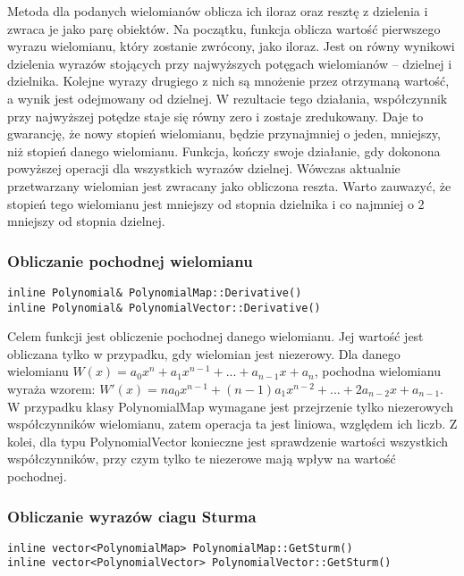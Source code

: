 \documentclass[twoside,a4paper]{book}
\begin{document}
Metoda dla podanych wielomianów oblicza ich iloraz oraz resztę z dzielenia i zwraca je jako parę obiektów. Na początku, funkcja oblicza wartość pierwszego wyrazu wielomianu, który zostanie zwrócony, jako iloraz. Jest on równy wynikowi dzielenia wyrazów stojących przy najwyższych potęgach wielomianów – dzielnej i dzielnika. Kolejne wyrazy drugiego z nich są mnożenie przez otrzymaną wartość, a wynik jest odejmowany od dzielnej. W rezultacie tego działania, współczynnik przy najwyższej potędze staje się równy zero i zostaje zredukowany. Daje to gwarancję, że nowy stopień wielomianu, będzie przynajmniej o jeden, mniejszy, niż stopień danego wielomianu. Funkcja, kończy swoje działanie, gdy dokonona powyższej operacji dla wszystkich wyrazów dzielnej. Wówczas aktualnie przetwarzany wielomian jest zwracany jako obliczona reszta. Warto zauwazyć, że stopień tego wielomianu jest mniejszy od stopnia dzielnika i co najmniej o 2 mniejszy od stopnia dzielnej.
\\

\subsubsection{Obliczanie pochodnej wielomianu}
\begin{lstlisting}
inline Polynomial& PolynomialMap::Derivative()
inline Polynomial& PolynomialVector::Derivative()
\end{lstlisting}

Celem funkcji jest obliczenie pochodnej danego wielomianu. Jej wartość jest obliczana tylko w przypadku, gdy wielomian jest niezerowy. Dla danego wielomianu $W(x) = a_0x^n + a_1x^{n-1} + ... + a_{n-1}x + a_n$, pochodna wielomianu wyraża wzorem: $W'(x) = na_0x^{n-1} + (n-1)a_1x^{n-2} + ... + 2a_{n-2}x + a_{n-1}$. W przypadku klasy PolynomialMap wymagane jest przejrzenie tylko niezerowych współczynników wielomianu, zatem operacja ta jest liniowa, względem ich liczb. Z kolei, dla typu PolynomialVector konieczne jest sprawdzenie wartości wszystkich współczynników, przy czym tylko te niezerowe mają wpływ na wartość pochodnej.

\subsubsection{Obliczanie wyrazów ciagu Sturma}
\begin{lstlisting}
inline vector<PolynomialMap> PolynomialMap::GetSturm()
inline vector<PolynomialVector> PolynomialVector::GetSturm()
\end{lstlisting}
\end{document}
